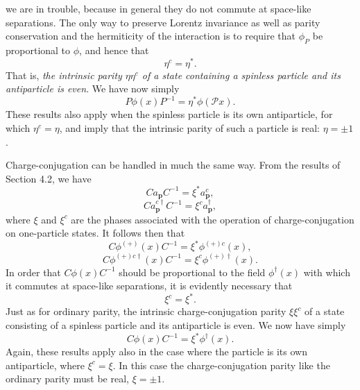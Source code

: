 we are in trouble, because in general they do not commute at space-like
separations. The only way to preserve Lorentz invariance as well as parity
conservation and the hermiticity of the interaction is to require that
$\phi_P$ be proportional to $\phi$, and hence that
\begin{equation}
  \eta^c=\eta^*.
  \tag{5.2.18}\label{eq:5.2.18}
\end{equation}
That is, \textit{the intrinsic parity $\eta\eta^c$ of a state containing a
spinless particle and its antiparticle is even}. We have now simply
\begin{equation}
  P\phi(x)P^{-1}=\eta^*\phi(\mathcal{P}x).
  \tag{5.2.19}\label{eq:5.2.19}
\end{equation}
These results also apply when the spinless particle is its own antiparticle,
for which $\eta^c=\eta$, and imply that the intrinsic parity of such a particle
is real: $\eta=\pm1$.

Charge-conjugation can be handled in much the same way. From the results of
Section 4.2, we have
\begin{equation}
  C a_{\mathbf{p}}C^{-1}=\xi^*a^c_{\mathbf{p}},
  \tag{5.2.20}\label{eq:5.2.20}
\end{equation}
\begin{equation}
  C a^{c\dagger}_{\mathbf{p}}C^{-1}=\xi^c a^\dagger_{\mathbf{p}},
  \tag{5.2.21}\label{eq:5.2.21}
\end{equation}
where $\xi$ and $\xi^c$ are the phases associated with the operation of
charge-conjugation on one-particle states. It follows then that
\begin{equation}
  C\phi^{(+)}(x)C^{-1}=\xi^*\phi^{(+)c}(x),
  \tag{5.2.22}\label{eq:5.2.22}
\end{equation}
\begin{equation}
  C\phi^{(+)c\dagger}(x)C^{-1}=\xi^c\phi^{(+)\dagger}(x).
  \tag{5.2.23}\label{eq:5.2.23}
\end{equation}
In order that $C\phi(x)C^{-1}$ should be proportional to the field
$\phi^\dagger(x)$ with which it commutes at space-like separations, it is
evidently necessary that
\begin{equation}
  \xi^c=\xi^*.
  \tag{5.2.24}\label{eq:5.2.24}
\end{equation}
Just as for ordinary parity, the intrinsic charge-conjugation parity
$\xi\xi^c$ of a state consisting of a spinless particle and its antiparticle
is even. We now have simply
\begin{equation}
  C\phi(x)C^{-1}=\xi^*\phi^\dagger(x).
  \tag{5.2.25}\label{eq:5.2.25}
\end{equation}
Again, these results apply also in the case where the particle is its own
antiparticle, where $\xi^c=\xi$. In this case the charge-conjugation parity
like the ordinary parity must be real, $\xi=\pm1$.

